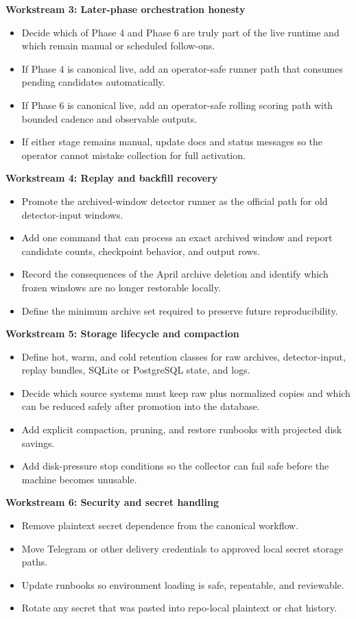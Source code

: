\documentclass{article}
\begin{document}
\textbf{Workstream 3: Later-phase orchestration honesty}
\begin{itemize}
\item Decide which of Phase 4 and Phase 6 are truly part of the live runtime and which remain manual or scheduled follow-ons.
\item If Phase 4 is canonical live, add an operator-safe runner path that consumes pending candidates automatically.
\item If Phase 6 is canonical live, add an operator-safe rolling scoring path with bounded cadence and observable outputs.
\item If either stage remains manual, update docs and status messages so the operator cannot mistake collection for full activation.
\end{itemize}

\textbf{Workstream 4: Replay and backfill recovery}
\begin{itemize}
\item Promote the archived-window detector runner as the official path for old detector-input windows.
\item Add one command that can process an exact archived window and report candidate counts, checkpoint behavior, and output rows.
\item Record the consequences of the April archive deletion and identify which frozen windows are no longer restorable locally.
\item Define the minimum archive set required to preserve future reproducibility.
\end{itemize}

\textbf{Workstream 5: Storage lifecycle and compaction}
\begin{itemize}
\item Define hot, warm, and cold retention classes for raw archives, detector-input, replay bundles, SQLite or PostgreSQL state, and logs.
\item Decide which source systems must keep raw plus normalized copies and which can be reduced safely after promotion into the database.
\item Add explicit compaction, pruning, and restore runbooks with projected disk savings.
\item Add disk-pressure stop conditions so the collector can fail safe before the machine becomes unusable.
\end{itemize}

\textbf{Workstream 6: Security and secret handling}
\begin{itemize}
\item Remove plaintext secret dependence from the canonical workflow.
\item Move Telegram or other delivery credentials to approved local secret storage paths.
\item Update runbooks so environment loading is safe, repeatable, and reviewable.
\item Rotate any secret that was pasted into repo-local plaintext or chat history.
\end{itemize}
\end{document}

